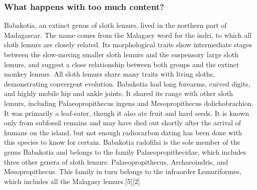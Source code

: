 \documentclass[handout,aspectratio=169]{beamer}
\begin{document}
\begin{frame}[allowframebreaks]
    \frametitle{What happens with too much content?}

    Babakotia, an extinct genus of sloth lemurs, lived in the northern part of
    Madagascar. The name comes from the Malagasy word for the indri, to which
    all sloth lemurs are closely related. Its morphological traits show
    intermediate stages between the slow-moving smaller sloth lemurs and the
    suspensory large sloth lemurs, and suggest a close relationship between
    both groups and the extinct monkey lemurs. All sloth lemurs share many
    traits with living sloths, demonstrating convergent evolution. Babakotia
    had long forearms, curved digits, and highly mobile hip and ankle joints.
    It shared its range with other sloth lemurs, including Palaeopropithecus
    ingens and Mesopropithecus dolichobrachion. It was primarily a leaf-eater,
    though it also ate fruit and hard seeds. It is known only from subfossil
    remains and may have died out shortly after the arrival of humans on the
    island, but not enough radiocarbon dating has been done with this species
    to know for certain. Babakotia radofilai is the sole member of the genus
    Babakotia and belongs to the family Palaeopropithecidae, which includes
    three other genera of sloth lemurs: Palaeopropithecus, Archaeoindris, and
    Mesopropithecus. This family in turn belongs to the infraorder
    Lemuriformes, which includes all the Malagasy lemurs.[5][2]

\end{frame}




\end{document}
